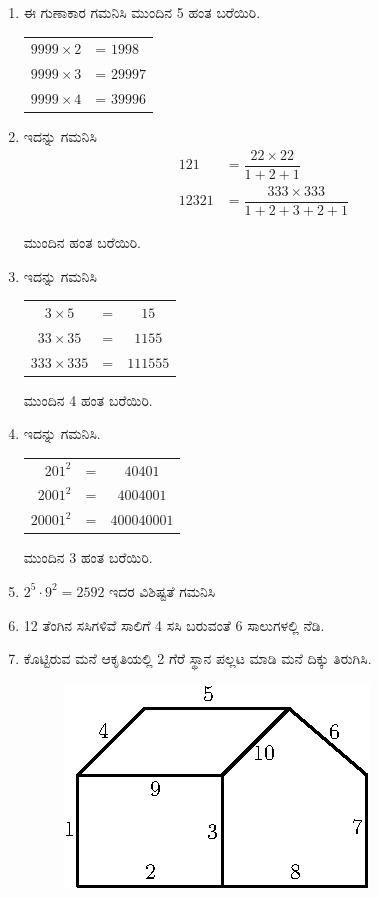 \begin{enumerate}
\item ಈ ಗುಣಾಕಾರ ಗಮನಿಸಿ ಮುಂದಿನ 5 ಹಂತ ಬರೆಯಿರಿ. 

\begin{tabular}{l@{\;}l}
$9999\times 2$ & = $1998$\\
$9999\times 3$ & = $29997$\\
$9999\times 4$ & = $39996$
\end{tabular} 

\item ಇದನ್ನು ಗಮನಿಸಿ 
\begin{align*}
121 & = \dfrac{22\times 22}{1 + 2 + 1}\\
12321 & = \dfrac{333 \times 333}{1 + 2 + 3 + 2 + 1}
\end{align*}  

ಮುಂದಿನ ಹಂತ ಬರೆಯಿರಿ. 

\item ಇದನ್ನು ಗಮನಿಸಿ 

\begin{tabular}{c@{\;}c@{\;}c}
$3\times 5$ & = & $15$\\
$33\times 35$ & = & $1155$\\
$333 \times 335$ & = & $111555$
\end{tabular}

ಮುಂದಿನ 4 ಹಂತ ಬರೆಯಿರಿ. 

\item ಇದನ್ನು ಗಮನಿಸಿ.

\begin{tabular}[[t]{r@{\;}c@{\;}c}
$201^{2}$ & = & $40401$\\
$2001^{2}$ & = & $4004001$\\
$20001^{2}$ & = & $400040001$
\end{tabular}

ಮುಂದಿನ 3 ಹಂತ ಬರೆಯಿರಿ. 

\item $2^{5} \cdot 9^{2} = 2592$ ಇದರ ವಿಶಿಷ್ಟತೆ ಗಮನಿಸಿ 

\item 12 ತೆಂಗಿನ ಸಸಿಗಳಿವೆ ಸಾಲಿಗೆ 4 ಸಸಿ ಬರುವಂತೆ 6 ಸಾಲುಗಳಲ್ಲಿ ನೆಡಿ. 

\item ಕೊಟ್ಟಿರುವ ಮನೆ ಆಕೃತಿಯಲ್ಲಿ 2 ಗೆರೆ ಸ್ಥಾನ ಪಲ್ಲಟ ಮಾಡಿ ಮನೆ ದಿಕ್ಕು ತಿರುಗಿಸಿ. 
\phantom{a}
\vskip -0.8cm
\begin{figure}[H]
\centering
\includegraphics{images/chap5/q19.eps}
\end{figure}


\end{enumerate}
